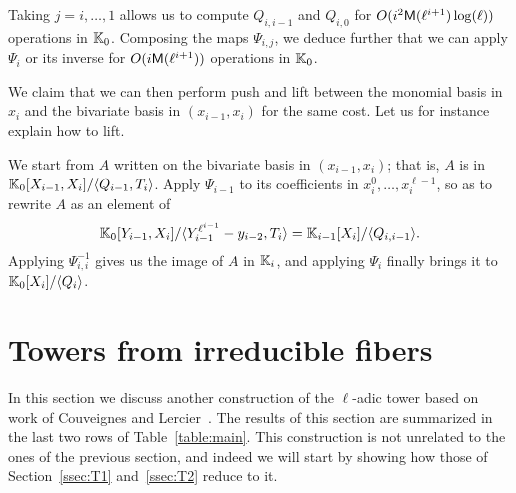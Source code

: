 \documentclass{sig-alternate}
\begin{document}
\medskip

Taking $j=i,\dots,1$ allows us to compute $Q_{i,i-1}$ and $Q_{i,0}$
for $O(i^2\mathsf{M}(\ell^{i+1})\log(\ell))$ operations in $\mathbb{K}_0$. Composing
the maps $\Psi_{i,j}$, we deduce further that we can apply $\Psi_i$ or
its inverse for $O(i\mathsf{M}(\ell^{i+1}))$ operations in $\mathbb{K}_0$.  

We claim that we can then perform push and lift between the monomial
basis in $x_i$ and the bivariate basis in $(x_{i-1},x_i)$ for the same
cost. Let us for instance explain how to lift.

We start from $A$ written on the bivariate basis in $(x_{i-1},x_i)$;
that is, $A$ is in $\mathbb{K}_0[X_{i-1},X_i]/\langle Q_{i-1},
T_{i}\rangle$. Apply $\Psi_{i-1}$ to its coefficients in
$x_i^0,\dots,x_i^{\ell-1}$, so as to rewrite $A$ as an element of
$$\mathbb{K}_0[Y_{i-1},X_i]/\langle Y_{i-1}^{\ell^{i-1}}-y_{i-2},
T_{i}\rangle = \mathbb{K}_{i-1}[X_i]/\langle Q_{i,i-1} \rangle.$$ Applying
$\Psi_{i,i}^{-1}$ gives us the image of $A$ in $\mathbb{K}_i$, and applying
$\Psi_i$ finally brings it to $\mathbb{K}_0[X_i]/\langle Q_{i}\rangle$.



\section{Towers from irreducible fibers}
\label{sec:fibers}

In this section we discuss another construction of the $\ell$-adic
tower based on work of Couveignes and
Lercier~\cite{couveignes+lercier11}. The results of this section are
summarized in the last two rows of Table~\ref{table:main}. This
construction is not unrelated to the ones of the previous section, and
indeed we will start by showing how those of Section~\ref{ssec:T1}
and~\ref{ssec:T2} reduce to it.
\end{document}
